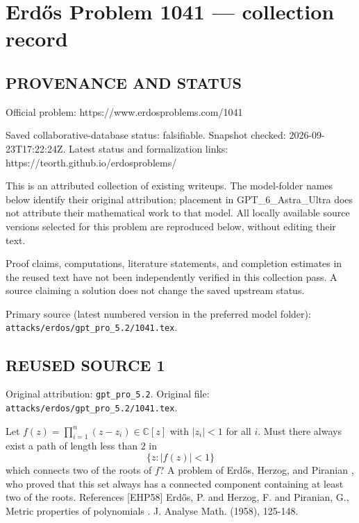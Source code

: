 \section*{Erd\H{o}s Problem 1041 --- collection record}

\subsection*{PROVENANCE AND STATUS}
Official problem: https://www.erdosproblems.com/1041

Saved collaborative-database status: falsifiable.
Snapshot checked: 2026-09-23T17:22:24Z.
Latest status and formalization links: https://teorth.github.io/erdosproblems/

This is an attributed collection of existing writeups. The model-folder names below identify their original attribution; placement in GPT\_6\_Astra\_Ultra does not attribute their mathematical work to that model. All locally available source versions selected for this problem are reproduced below, without editing their text.

Proof claims, computations, literature statements, and completion estimates in the reused text have not been independently verified in this collection pass. A source claiming a solution does not change the saved upstream status.

Primary source (latest numbered version in the preferred model folder): \texttt{attacks/erdos/gpt\_pro\_5.2/1041.tex}.

\subsection*{REUSED SOURCE 1}
Original attribution: \texttt{gpt\_pro\_5.2}.
Original file: \texttt{attacks/erdos/gpt\_pro\_5.2/1041.tex}.


Let $f(z)=\prod_{i=1}^n(z-z_i)\in \mathbb{C}[z]$ with $\lvert z_i\rvert < 1$ for all $i$. Must there always exist a path of length less than $2$ in\[\{z: \lvert f(z)\rvert < 1\}\]which connects two of the roots of $f$? A problem of Erd\H{o}s, Herzog, and Piranian \cite{EHP58}, who proved that this set always has a connected component containing at least two of the roots. References [EHP58] Erd\H{o}s, P. and Herzog, F. and Piranian, G., Metric properties of polynomials . J. Analyse Math. (1958), 125-148.



